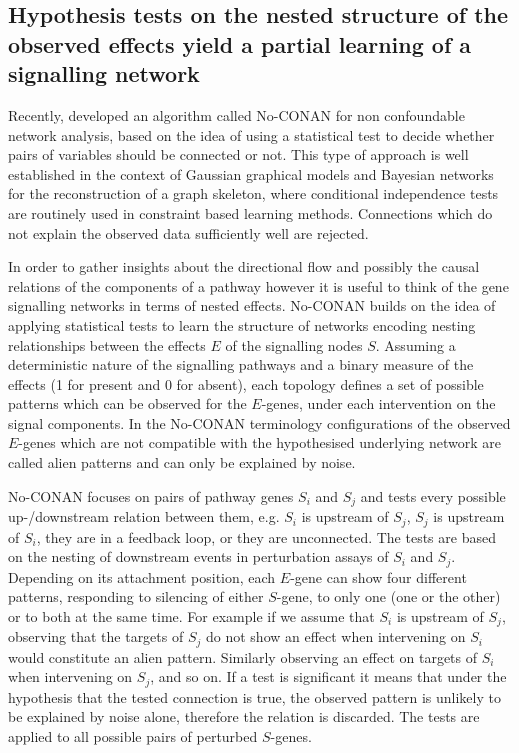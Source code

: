 
 \subsection*{Hypothesis tests on the nested structure of the observed effects yield a partial learning of a signalling network}

Recently, \cite{art:SadehMS2013} developed an algorithm called No-CONAN for non confoundable network analysis, based on the idea of using a statistical test to decide whether pairs of variables should be connected or not. This type of approach is well established in the context of Gaussian graphical models and Bayesian networks for the reconstruction of a graph skeleton, where conditional independence tests are routinely used in constraint based learning methods. Connections which do not explain the observed data sufficiently well are rejected. 

In order to gather insights about the directional flow and possibly the causal relations of the components of a pathway however it is useful to think of the gene signalling networks in terms of nested effects. No-CONAN builds on the idea of applying statistical tests to learn the structure of networks encoding nesting relationships between the effects $E$ of the signalling nodes $S$. Assuming a deterministic nature of the signalling pathways and a binary measure of the effects (1 for present and 0 for absent), each topology defines a set of possible patterns which can be observed for the $E$-genes, under each intervention on the signal components. In the No-CONAN terminology configurations of the observed $E$-genes which are not compatible with the hypothesised underlying network are called alien patterns and can only be explained by noise. 

No-CONAN focuses on pairs of pathway genes $S_i$ and $S_j$ and tests every possible up-/downstream relation between them, e.g. $S_i$ is upstream of $S_j$, $S_j$ is upstream of $S_i$, they are in a feedback loop, or they are unconnected. The tests are based on the nesting of downstream events in perturbation assays of $S_i$ and $S_j$. Depending on its attachment position, each $E$-gene can show four different patterns, responding to silencing of either $S$-gene, to only one (one or the other) or to both at the same time. For example if we assume that $S_i$ is upstream of $S_j$, observing that the targets of $S_j$ do not show an effect when intervening on $S_i$ would constitute an alien pattern. Similarly observing an effect on targets of $S_i$ when intervening on $S_j$, and so on. If a test is significant it means that under the hypothesis that the tested connection is true, the observed pattern is unlikely to be explained by noise alone, therefore the relation is discarded. The tests are applied to all possible pairs of perturbed $S$-genes. 

